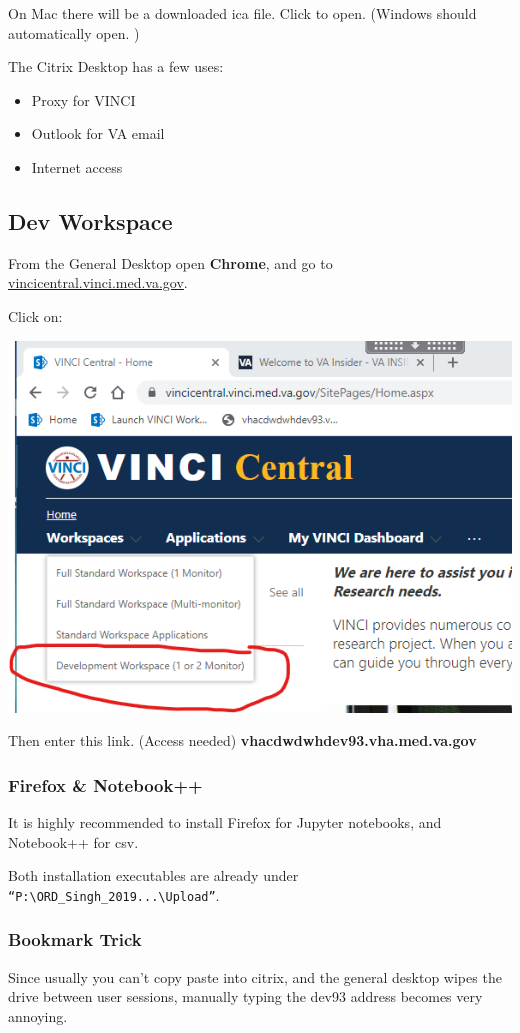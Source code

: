\documentclass[12pt]{article}
\theoremstyle{definition}
\begin{document}
On Mac there will be a downloaded ica file. Click to open. (Windows should automatically open. )

The Citrix Desktop has a few uses:
\begin{itemize}
    \item Proxy for VINCI
    \item Outlook for VA email
    \item Internet access
\end{itemize}

\subsection{Dev Workspace}
From the General Desktop open \textbf{Chrome}, and go to \url{vincicentral.vinci.med.va.gov}. 

Click on:

\includegraphics[width=\linewidth]{screenshots/vinci-connect-dev.png}

Then enter this link. (Access needed)
\textbf{vhacdwdwhdev93.vha.med.va.gov}

\subsubsection{Firefox \& Notebook++}
It is highly recommended to install Firefox for Jupyter notebooks, and Notebook++ for csv.

Both installation executables are already under \texttt{``P:\textbackslash ORD\_Singh\_2019...\textbackslash Upload''}.

\subsubsection{Bookmark Trick}
Since usually you can't copy paste into citrix, and the general desktop wipes the drive between user sessions, manually typing the dev93 address becomes very annoying. 
\end{document}
